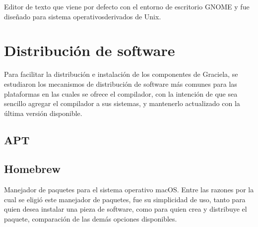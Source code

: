 Editor de texto que viene por defecto con el entorno de escritorio GNOME y fue
diseñado para sistema operativosderivados de Unix.

\section{Distribución de software}

Para facilitar la distribución e instalación de los componentes de Graciela, se
estudiaron los mecanismos de distribución de software más comunes para las
plataformas en las cuales se ofrece el compilador, con la intención de que sea
sencillo agregar el compilador a sus sistemas, y mantenerlo actualizado con la
última versión disponible.

\subsection{APT}

\subsection{Homebrew}

Manejador de paquetes para el sistema operativo macOS. Entre las razones por
la cual se eligió este manejador de paquetes, fue su simplicidad de uso, tanto
para quien desea instalar una pieza de software, como para quien crea y
distribuye el paquete, comparación de las demás opciones disponibles.
